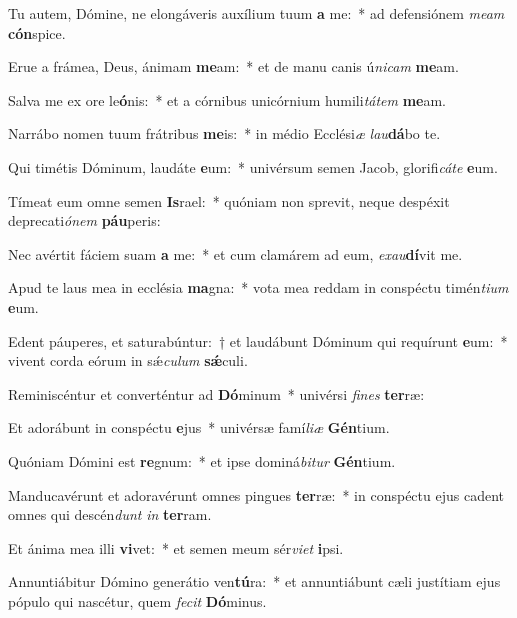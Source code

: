 \item Tu autem, Dómine, ne elongáveris auxílium tuum \textbf{a} me:~* ad defensiónem \textit{meam} \textbf{cón}spice.
\item Erue a frámea, Deus, ánimam \textbf{me}am:~* et de manu canis ú\textit{nicam} \textbf{me}am.
\item Salva me ex ore le\textbf{ó}nis:~* et a córnibus unicórnium humili\textit{tátem} \textbf{me}am.
\item Narrábo nomen tuum frátribus \textbf{me}is:~* in médio Ecclési\spurhspace\textit{æ} \textit{lau}\textbf{dá}bo te.
\item Qui timétis Dóminum, laudáte \textbf{e}um:~* univérsum semen Jacob, glorifi\textit{cáte} \textbf{e}um.
\item Tímeat eum omne semen \textbf{Is}rael:~* quóniam non sprevit, neque despéxit deprecati\textit{ónem} \textbf{páu}peris:
\item Nec avértit fáciem suam \textbf{a} me:~* et cum clamárem ad eum, \textit{exau}\textbf{dí}vit me.
\item Apud te laus mea in ecclésia \textbf{ma}gna:~* vota mea reddam in conspéctu timén\textit{tium} \textbf{e}um.
\item Edent páuperes, et saturabúntur:~† et laudábunt Dóminum qui requírunt \textbf{e}um:~* vivent corda eórum in sǽ\tinyhspace\textit{culum} \textbf{sǽ}culi.
\item Reminiscéntur et converténtur ad \textbf{Dó}minum~* univérsi \textit{fines} \textbf{ter}ræ:
\item Et adorábunt in conspéctu \textbf{e}jus~* univérsæ famí\tinyhspace\textit{liæ} \textbf{Gén}tium.
\item Quóniam Dómini est \textbf{re}gnum:~* et ipse dominá\textit{bitur} \textbf{Gén}tium.
\item Manducavérunt et adoravérunt omnes pingues \textbf{ter}ræ:~* in conspéctu ejus cadent omnes qui descén\tinyhspace\textit{dunt} \textit{in} \textbf{ter}ram.
\item Et ánima mea illi \textbf{vi}vet:~* et semen meum sér\textit{viet} \textbf{i}psi.
\item Annuntiábitur Dómino generátio ven\textbf{tú}ra:~* et annuntiábunt cæli justítiam ejus pópulo qui nascétur, quem \textit{fecit} \textbf{Dó}minus.
